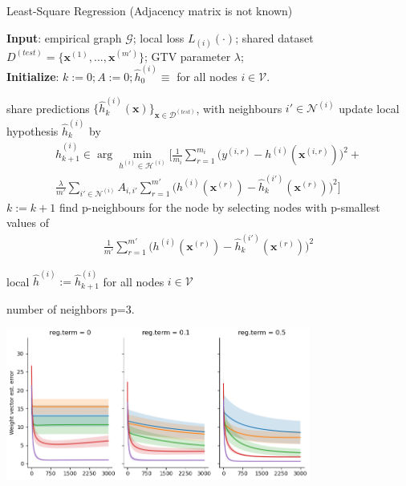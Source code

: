 \documentclass{article}
\newcommand{\graph}{\mathcal{G}}
\begin{document}
\begin{algorithm}[htbp]
	\caption{Least-Square Regression (Adjacency matrix is not known)}
	\label{alg_X_param}
	{\bf Input}: empirical graph $\graph$; 
	local loss $L_{(i)}{(\cdot)}$; shared dataset $D^{(test)} = \{\mathbf{x}^{(1)}, ..., \mathbf{x}^{(m')}\}$; GTV parameter $\lambda$; \\
	{\bf Initialize}: $k:=0; A:=0; \widehat{h}_{0}^{(i)} \!\equiv\!$ for all nodes $i \in \mathcal{V}$.
	\begin{algorithmic}[1]
		\State share predictions $\{\widehat{h}_{k}^{(i)}(\mathbf{x})\}_{\mathbf{x} \in \mathcal{D}^(test)}$, 
		with neighbours $i' \in \mathcal{N}^{(i)}$ 
		\State update local hypothesis $\widehat{h}_{k}^{(i)}$ by
            \begin{multline*}
            \widehat{h}_{k+1}^{(i)} \in  \arg \min_{h^{(i)} \in \mathcal{H}^{(i)}} 
            \biggl[ \frac{1}{m_i}  \sum_{r=1}^{m_i} \biggl( y^{(i,r)} - h^{(i)}(\mathbf{x}^{(i,r)})  \biggr)^2 + \\
            \frac{\lambda}{m'} \sum_{i' \in \mathcal{N}^{(i)}}A_{i,i'}\sum_{r=1}^{m'} \biggl( h^{(i)}(\mathbf{x}^{(r)}) - \widehat{h}_{k}^{(i')}(\mathbf{x}^{(r)}) \biggr)^2 \biggr]
            \end{multline*}
		\EndFor
		\State $k := k+1$
        \State find  p-neighbours for the node by selecting nodes with p-smallest values of
             \begin{align}
                \frac{1}{m'} \sum_{r=1}^{m'} \biggl( h^{(i)}(\mathbf{x}^{(r)}) - \widehat{h}_{k}^{(i')}(\mathbf{x}^{(r)}) \biggr)^2 
             \end{align}
        
        
        \EndFor
		\EndWhile
			  \Ensure local $\widehat{h}^{(i)} := \widehat{h}_{k+1}^{(i)}$ for all nodes $i \in \mathcal{V}$
	\end{algorithmic}
\end{algorithm}

\newpage
number of neighbors  p=3.
\vspace{5mm}

\includegraphics[width=10cm]{linreg_nneib_3.png}
\end{document}
